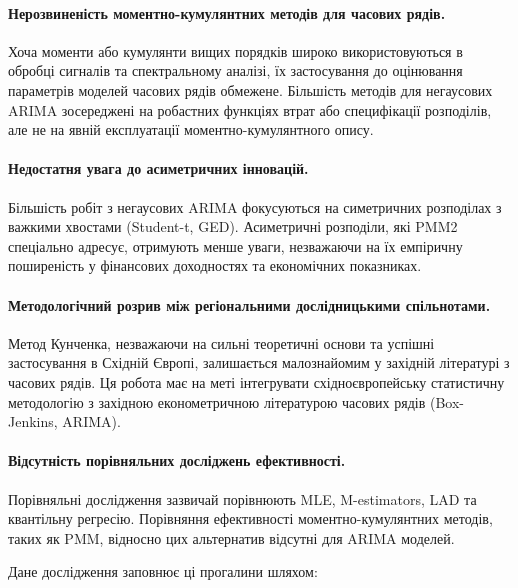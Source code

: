 \documentclass[12pt,a4paper]{article}
\begin{document}
\paragraph{Нерозвиненість моментно-кумулянтних методів для часових рядів.} Хоча моменти або кумулянти вищих порядків широко використовуються в обробці сигналів та спектральному аналізі, їх застосування до оцінювання параметрів моделей часових рядів обмежене. Більшість методів для негаусових ARIMA зосереджені на робастних функціях втрат або специфікації розподілів, але не на явній експлуатації моментно-кумулянтного опису.

\paragraph{Недостатня увага до асиметричних інновацій.} Більшість робіт з негаусових ARIMA фокусуються на симетричних розподілах з важкими хвостами (Student-t, GED). Асиметричні розподіли, які PMM2 спеціально адресує, отримують менше уваги, незважаючи на їх емпіричну поширеність у фінансових доходностях та економічних показниках.

\paragraph{Методологічний розрив між регіональними дослідницькими спільнотами.} Метод Кунченка, незважаючи на сильні теоретичні основи та успішні застосування в Східній Європі, залишається малознайомим у західній літературі з часових рядів. Ця робота має на меті інтегрувати східноєвропейську статистичну методологію з західною економетричною літературою часових рядів (Box-Jenkins, ARIMA).

\paragraph{Відсутність порівняльних досліджень ефективності.} Порівняльні дослідження зазвичай порівнюють MLE, M-estimators, LAD та квантільну регресію. Порівняння ефективності моментно-кумулянтних методів, таких як PMM, відносно цих альтернатив відсутні для ARIMA моделей.

Дане дослідження заповнює ці прогалини шляхом:
\end{document}
